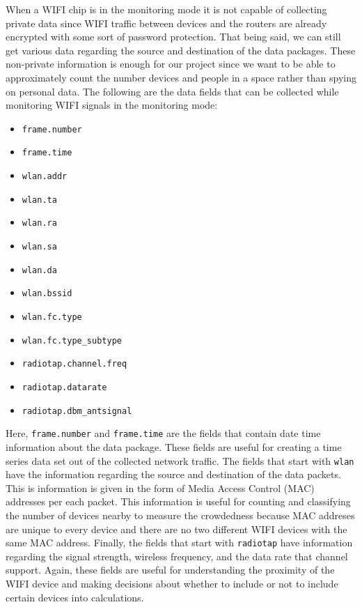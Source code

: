 \documentclass[journal, 12pt]{IEEEtran}
\begin{document}
\noindent When a WIFI chip is in the monitoring mode it is not capable of collecting private data since WIFI traffic between devices and the routers are already encrypted with some sort of password protection. That being said, we can still get various data regarding the source and destination of the data packages. These non-private information is enough for our project since we want to be able to approximately count the number devices and people in a space rather than spying on personal data. The following are the data fields that can be collected while monitoring WIFI signals in the monitoring mode:

\begin{itemize}
    \item \texttt{frame.number}
    \item \texttt{frame.time}
    \item \texttt{wlan.addr}
    \item \texttt{wlan.ta}
    \item \texttt{wlan.ra}
    \item \texttt{wlan.sa}
    \item \texttt{wlan.da}
    \item \texttt{wlan.bssid}
    \item \texttt{wlan.fc.type}
    \item \texttt{wlan.fc.type\_subtype}
    \item \texttt{radiotap.channel.freq}
    \item \texttt{radiotap.datarate}
    \item \texttt{radiotap.dbm\_antsignal}
\end{itemize}
\medskip
\noindent Here, \texttt{frame.number} and \texttt{frame.time} are the fields that contain date time information about the data package. These fields are useful for creating a time series data set out of the collected network traffic. The fields that start with \texttt{wlan} have the information regarding the source and destination of the data packets. This is information is given in the form of Media Access Control (MAC) addresses per each packet. This information is useful for counting and classifying the number of devices nearby to measure the crowdedness because MAC addreses are unique to every device and there are no two different WIFI devices with the same MAC address. Finally, the fields that start with \texttt{radiotap} have information regarding the signal strength, wireless frequency, and the data rate that channel support. Again, these fields are useful for understanding the proximity of the WIFI device and making decisions about whether to include or not to include certain devices into calculations.\\
\end{document}
